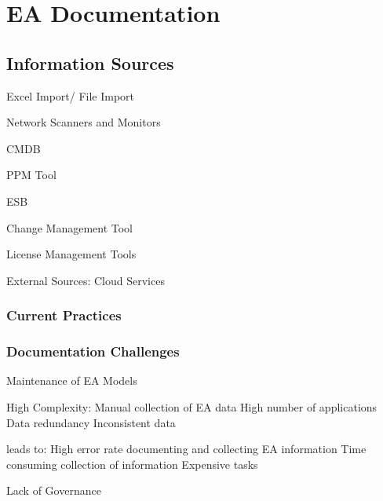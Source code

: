 
\chapter{EA Documentation}\label{chapter:theoretical background}

\section{Information Sources} %


Excel Import/ File Import

Network Scanners and Monitors

CMDB

PPM Tool

ESB

Change Management Tool

License Management Tools

External Sources: Cloud Services

\subsection{Current Practices}

\subsection{Documentation Challenges} %

Maintenance of EA Models

High Complexity: Manual collection of EA data
High number of applications
Data redundancy
Inconsistent data

leads to: High error rate documenting and collecting EA information
Time consuming collection of information
Expensive tasks

Lack of Governance










